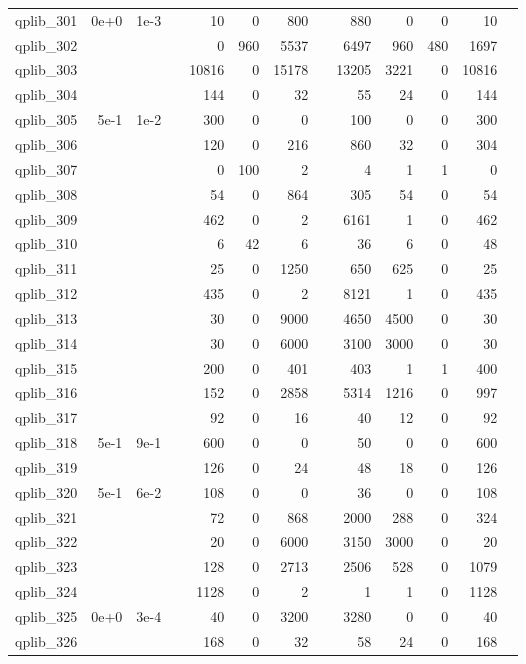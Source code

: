\begin{table}
\begin{tabular}{lrrrrrrrrrrrr}
									
qplib\_301	&	0e+0	&	1e-3	&	&	10	&	0	&	800	&	&	880	&	0	&	0	&	10	\\
qplib\_302	&		&		&	&	0	&	960	&	5537	&	&	6497	&	960	&	480	&	1697	\\
qplib\_303	&		&		&	&	10816	&	0	&	15178	&	&	13205	&	3221	&	0	&	10816	\\
qplib\_304	&		&		&	&	144	&	0	&	32	&	&	55	&	24	&	0	&	144	\\
qplib\_305	&	5e-1	&	1e-2	&	&	300	&	0	&	0	&	&	100	&	0	&	0	&	300	\\
qplib\_306	&		&		&	&	120	&	0	&	216	&	&	860	&	32	&	0	&	304	\\
qplib\_307	&		&		&	&	0	&	100	&	2	&	&	4	&	1	&	1	&	0	\\
qplib\_308	&		&		&	&	54	&	0	&	864	&	&	305	&	54	&	0	&	54	\\
qplib\_309	&		&		&	&	462	&	0	&	2	&	&	6161	&	1	&	0	&	462	\\
qplib\_310	&		&		&	&	6	&	42	&	6	&	&	36	&	6	&	0	&	48	\\
qplib\_311	&		&		&	&	25	&	0	&	1250	&	&	650	&	625	&	0	&	25	\\
qplib\_312	&		&		&	&	435	&	0	&	2	&	&	8121	&	1	&	0	&	435	\\
qplib\_313	&		&		&	&	30	&	0	&	9000	&	&	4650	&	4500	&	0	&	30	\\
qplib\_314	&		&		&	&	30	&	0	&	6000	&	&	3100	&	3000	&	0	&	30	\\
qplib\_315	&		&		&	&	200	&	0	&	401	&	&	403	&	1	&	1	&	400	\\
qplib\_316	&		&		&	&	152	&	0	&	2858	&	&	5314	&	1216	&	0	&	997	\\
qplib\_317	&		&		&	&	92	&	0	&	16	&	&	40	&	12	&	0	&	92	\\
qplib\_318	&	5e-1	&	9e-1	&	&	600	&	0	&	0	&	&	50	&	0	&	0	&	600	\\
qplib\_319	&		&		&	&	126	&	0	&	24	&	&	48	&	18	&	0	&	126	\\
qplib\_320	&	5e-1	&	6e-2	&	&	108	&	0	&	0	&	&	36	&	0	&	0	&	108	\\
qplib\_321	&		&		&	&	72	&	0	&	868	&	&	2000	&	288	&	0	&	324	\\
qplib\_322	&		&		&	&	20	&	0	&	6000	&	&	3150	&	3000	&	0	&	20	\\
qplib\_323	&		&		&	&	128	&	0	&	2713	&	&	2506	&	528	&	0	&	1079	\\
qplib\_324	&		&		&	&	1128	&	0	&	2	&	&	1	&	1	&	0	&	1128	\\
qplib\_325	&	0e+0	&	3e-4	&	&	40	&	0	&	3200	&	&	3280	&	0	&	0	&	40	\\
qplib\_326	&		&		&	&	168	&	0	&	32	&	&	58	&	24	&	0	&	168	\\

\end{tabular}
\end{table}

